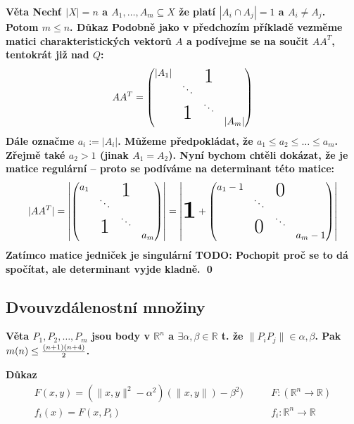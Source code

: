 \documentclass[a4paper,12pt,titlepage]{article}
\newcommand{\dk}{\smallskip\noindent\bf Důkaz\rm{} }
\newcommand{\vt}{\smallskip\noindent\bf Věta\rm{} }
\newcommand{\R}{\mathbb{R}}
\newcommand{\todo}[1]{\bf TODO: \rm#1}
\newcommand\bigzero{\makebox(0,0){\text{\huge0}}}
\newcommand\bigone{\makebox(0,0){\text{\huge1}}}
\begin{document}
\vt Nechť $|X|=n$ a $A_1, \dots, A_m \subseteq X$ že platí $|A_i \cap A_j| = 1 $ 
a $A_i \neq A_j$. Potom $m \leq n$.
\dk Podobně jako v předchozím příkladě vezměme matici charakteristických vektorů 
$A$ a podívejme se na součit $AA^T$, tentokrát již nad $Q$:
\begin{align}
	AA^T = \left(\begin{matrix}
	|A_1| & &\bigone & \\
	& \ddots && \\
	&\bigone& \ddots & \\
	&&  &|A_m|
	\end{matrix}\right)
\end{align}
Dále označme $a_i := |A_i|$. Můžeme předpokládat, že $a_1 \leq a_2 \leq \dots 
\leq a_m$. Zřejmě také $a_2 > 1$ (jinak $A_1 = A_2$). Nyní bychom chtěli 
dokázat, že je matice regulární -- proto se podíváme na determinant této matice:
\begin{align}
	|AA^T| = \left|\left(\begin{matrix}
	a_1 & &\bigone & \\
	& \ddots && \\
	&\bigone& \ddots & \\
	&&  &a_m
	\end{matrix}\right)\right|
	= \left|\begin{matrix}\text{\bf\Huge 1}\end{matrix}
	+\left(\begin{matrix}
	a_1-1 & &\bigzero & \\
	& \ddots && \\
	&\bigzero& \ddots & \\
	&&  &a_m-1
	\end{matrix}\right)\right|
\end{align}
Zatímco matice jedniček je singulární \todo{Pochopit proč se to dá spočítat, ale 
determinant vyjde kladně}.  \qed

\subsection{Dvouvzdálenostní množiny}
\vt $P_1, P_2, \dots, P_m$ jsou body v $\R^n$ a $\exists \alpha, \beta \in \R$ t. že $\|P_iP_j\| \in {\alpha, \beta}$. Pak $m(n) \leq {(n+1)(n+4)\over 2}$.

\dk
\begin{align}
F(x,y) = (\|x,y\|^2-\alpha^2)(\|x,y\|)-\beta^2)&\qquad F: (\R^n \rightarrow \R) \\
f_i(x) = F(x, P_i)&\qquad f_i: \R^n \rightarrow \R
\end{align}
\end{document}
